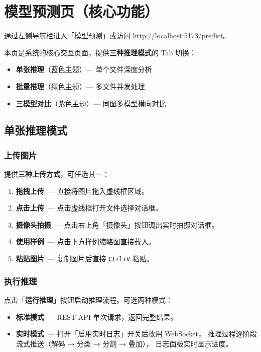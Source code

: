 \documentclass[12pt, a4paper, openany]{ctexbook}
\begin{document}
\chapter{模型预测页（核心功能）}

通过左侧导航栏进入「模型预测」或访问 \url{http://localhost:5173/predict}。

本页是系统的核心交互页面，提供\textbf{三种推理模式}的 Tab 切换：

\begin{itemize}
  \item \textbf{单张推理}（蓝色主题）— 单个文件深度分析
  \item \textbf{批量推理}（绿色主题）— 多文件并发处理
  \item \textbf{三模型对比}（紫色主题）— 同图多模型横向对比
\end{itemize}

\section{单张推理模式}

\subsection{上传图片}

提供\textbf{三种上传方式}，可任选其一：

\begin{enumerate}
  \item \textbf{拖拽上传}\ — 直接将图片拖入虚线框区域。
  \item \textbf{点击上传}\ — 点击虚线框打开文件选择对话框。
  \item \textbf{摄像头拍摄}\ — 点击右上角「摄像头」按钮调出实时拍摄对话框。
  \item \textbf{使用样例}\ — 点击下方样例缩略图直接载入。
  \item \textbf{粘贴图片}\ — 复制图片后直接 \texttt{Ctrl+V} 粘贴。
\end{enumerate}

\subsection{执行推理}

点击「\textbf{运行推理}」按钮启动推理流程。可选两种模式：

\begin{itemize}
  \item \textbf{标准模式}\ — REST API 单次请求，返回完整结果。
  \item \textbf{实时模式}\ — 打开「启用实时日志」开关后改用 WebSocket，
        推理过程逐阶段流式推送（解码 → 分类 → 分割 → 叠加），
        日志面板实时显示进度。
\end{itemize}
\end{document}
